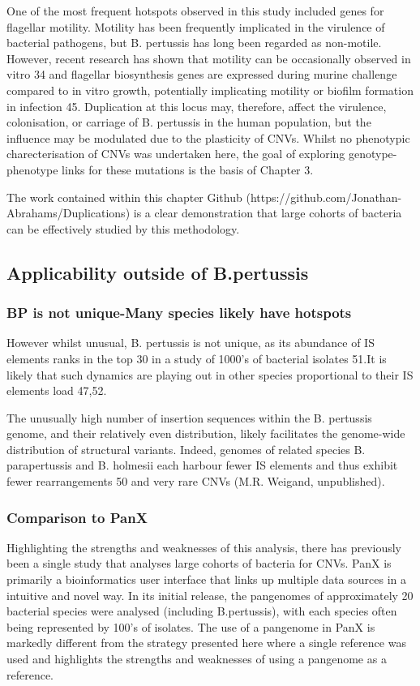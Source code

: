 \documentclass{article}
\begin{document}
One of the most frequent hotspots observed in this study included genes for flagellar motility. Motility has been frequently implicated in the virulence of bacterial pathogens, but B. pertussis has long been regarded as non-motile. However, recent research has shown that motility can be occasionally observed in vitro 34 and flagellar biosynthesis genes are expressed during murine challenge compared to in vitro growth, potentially implicating motility or biofilm formation in infection 45. Duplication at this locus may, therefore, affect the virulence, colonisation, or carriage of B. pertussis in the human population, but the influence may be modulated due to the plasticity of CNVs. Whilst no phenotypic charecterisation of CNVs was undertaken here, the goal of exploring genotype-phenotype links for these mutations is the basis of Chapter 3.

The work contained within this chapter Github (https://github.com/Jonathan-Abrahams/Duplications) is a clear demonstration that large cohorts of bacteria can be effectively studied by this methodology.

\subsection{Applicability outside of B.pertussis}
\subsubsection{BP is not unique-Many species likely have hotspots}
However whilst unusual, B. pertussis is not unique, as its abundance of IS elements ranks in the top 30 in a study of 1000’s of bacterial isolates 51.It is likely that such dynamics are playing out in other species proportional to their IS elements load 47,52.

The unusually high number of insertion sequences within the B. pertussis genome, and their relatively even distribution, likely facilitates the genome-wide distribution of structural variants. Indeed, genomes of related species B. parapertussis and B. holmesii each harbour fewer IS elements and thus exhibit fewer rearrangements 50 and very rare CNVs (M.R. Weigand, unpublished). 

\subsubsection{Comparison to PanX}

Highlighting the strengths and weaknesses of this analysis, there has previously been a single study that analyses large cohorts of bacteria for CNVs. PanX is primarily a bioinformatics user interface that links up multiple data sources in a intuitive and novel way. In its initial release, the pangenomes of approximately 20 bacterial species were analysed (including B.pertussis), with each species often being represented by 100's of isolates. The use of a pangenome in PanX is markedly different from the strategy presented here where a single reference was used and highlights the strengths and weaknesses of using a pangenome as a reference. 
\end{document}
